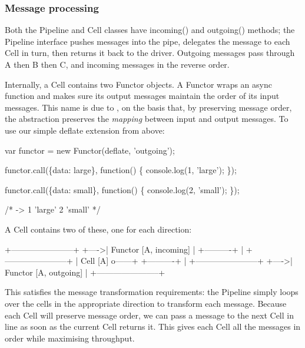 \subsubsection*{Message processing}

Both the {\ttfamily Pipeline} and {\ttfamily Cell} classes have {\ttfamily incoming()} and {\ttfamily outgoing()} methods; the {\ttfamily Pipeline} interface pushes messages into the pipe, delegates the message to each {\ttfamily Cell} in turn, then returns it back to the driver. Outgoing messages pass through {\ttfamily A} then {\ttfamily B} then {\ttfamily C}, and incoming messages in the reverse order.

Internally, a {\ttfamily Cell} contains two {\ttfamily Functor} objects. A {\ttfamily Functor} wraps an async function and makes sure its output messages maintain the order of its input messages. This name is due to \href{https://github.com/fronx}{\tt }, on the basis that, by preserving message order, the abstraction preserves the {\itshape mapping} between input and output messages. To use our simple {\ttfamily deflate} extension from above\+:


\begin{DoxyCode}
var functor = new Functor(deflate, 'outgoing');

functor.call(\{data: large\}, function() \{
  console.log(1, 'large');
\});

functor.call(\{data: small\}, function() \{
  console.log(2, 'small');
\});

/*  ->  1 'large'
        2 'small' */
\end{DoxyCode}


A {\ttfamily Cell} contains two of these, one for each direction\+:

\begin{DoxyVerb}                        +-----------------------+
                  +---->| Functor [A, incoming] |
+----------+      |     +-----------------------+
| Cell [A] o------+
+----------+      |     +-----------------------+
                  +---->| Functor [A, outgoing] |
                        +-----------------------+
\end{DoxyVerb}


This satisfies the message transformation requirements\+: the {\ttfamily Pipeline} simply loops over the cells in the appropriate direction to transform each message. Because each {\ttfamily Cell} will preserve message order, we can pass a message to the next {\ttfamily Cell} in line as soon as the current {\ttfamily Cell} returns it. This gives each {\ttfamily Cell} all the messages in order while maximising throughput.

